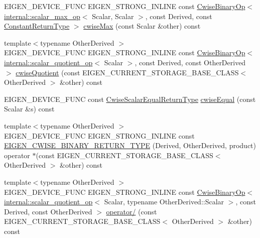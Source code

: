 \begin{DoxyCompactItemize}
\item 
E\+I\+G\+E\+N\+\_\+\+D\+E\+V\+I\+C\+E\+\_\+\+F\+U\+NC E\+I\+G\+E\+N\+\_\+\+S\+T\+R\+O\+N\+G\+\_\+\+I\+N\+L\+I\+NE const \mbox{\hyperlink{class_eigen_1_1_cwise_binary_op}{Cwise\+Binary\+Op}}$<$ \mbox{\hyperlink{struct_eigen_1_1internal_1_1scalar__max__op}{internal\+::scalar\+\_\+max\+\_\+op}}$<$ Scalar, Scalar $>$, const Derived, const \mbox{\hyperlink{class_eigen_1_1_cwise_nullary_op}{Constant\+Return\+Type}} $>$ \mbox{\hyperlink{class_eigen_1_1_array_base_af4a304df66f2c3059224d26155918084}{cwise\+Max}} (const Scalar \&other) const
\item 
{\footnotesize template$<$typename Other\+Derived $>$ }\\E\+I\+G\+E\+N\+\_\+\+D\+E\+V\+I\+C\+E\+\_\+\+F\+U\+NC E\+I\+G\+E\+N\+\_\+\+S\+T\+R\+O\+N\+G\+\_\+\+I\+N\+L\+I\+NE const \mbox{\hyperlink{class_eigen_1_1_cwise_binary_op}{Cwise\+Binary\+Op}}$<$ \mbox{\hyperlink{struct_eigen_1_1internal_1_1scalar__quotient__op}{internal\+::scalar\+\_\+quotient\+\_\+op}}$<$ Scalar $>$, const Derived, const Other\+Derived $>$ \mbox{\hyperlink{class_eigen_1_1_array_base_a91636e129a14395905c9bd76d7141c55}{cwise\+Quotient}} (const E\+I\+G\+E\+N\+\_\+\+C\+U\+R\+R\+E\+N\+T\+\_\+\+S\+T\+O\+R\+A\+G\+E\+\_\+\+B\+A\+S\+E\+\_\+\+C\+L\+A\+SS$<$ Other\+Derived $>$ \&other) const
\item 
E\+I\+G\+E\+N\+\_\+\+D\+E\+V\+I\+C\+E\+\_\+\+F\+U\+NC const \mbox{\hyperlink{class_eigen_1_1_cwise_binary_op}{Cwise\+Scalar\+Equal\+Return\+Type}} \mbox{\hyperlink{class_eigen_1_1_array_base_a27bfdb32677ef8e25b1d2302a25ea504}{cwise\+Equal}} (const Scalar \&s) const
\item 
{\footnotesize template$<$typename Other\+Derived $>$ }\\E\+I\+G\+E\+N\+\_\+\+D\+E\+V\+I\+C\+E\+\_\+\+F\+U\+NC E\+I\+G\+E\+N\+\_\+\+S\+T\+R\+O\+N\+G\+\_\+\+I\+N\+L\+I\+NE const \mbox{\hyperlink{class_eigen_1_1_array_base_a963e061904b3a156d8b598b22b0c9f00}{E\+I\+G\+E\+N\+\_\+\+C\+W\+I\+S\+E\+\_\+\+B\+I\+N\+A\+R\+Y\+\_\+\+R\+E\+T\+U\+R\+N\+\_\+\+T\+Y\+PE}} (Derived, Other\+Derived, product) operator $\ast$(const E\+I\+G\+E\+N\+\_\+\+C\+U\+R\+R\+E\+N\+T\+\_\+\+S\+T\+O\+R\+A\+G\+E\+\_\+\+B\+A\+S\+E\+\_\+\+C\+L\+A\+SS$<$ Other\+Derived $>$ \&other) const
\item 
{\footnotesize template$<$typename Other\+Derived $>$ }\\E\+I\+G\+E\+N\+\_\+\+D\+E\+V\+I\+C\+E\+\_\+\+F\+U\+NC E\+I\+G\+E\+N\+\_\+\+S\+T\+R\+O\+N\+G\+\_\+\+I\+N\+L\+I\+NE const \mbox{\hyperlink{class_eigen_1_1_cwise_binary_op}{Cwise\+Binary\+Op}}$<$ \mbox{\hyperlink{struct_eigen_1_1internal_1_1scalar__quotient__op}{internal\+::scalar\+\_\+quotient\+\_\+op}}$<$ Scalar, typename Other\+Derived\+::\+Scalar $>$, const Derived, const Other\+Derived $>$ \mbox{\hyperlink{class_eigen_1_1_array_base_a65770de30d83fefe046011c1d2258391}{operator/}} (const E\+I\+G\+E\+N\+\_\+\+C\+U\+R\+R\+E\+N\+T\+\_\+\+S\+T\+O\+R\+A\+G\+E\+\_\+\+B\+A\+S\+E\+\_\+\+C\+L\+A\+SS$<$ Other\+Derived $>$ \&other) const

\end{DoxyCompactItemize}
